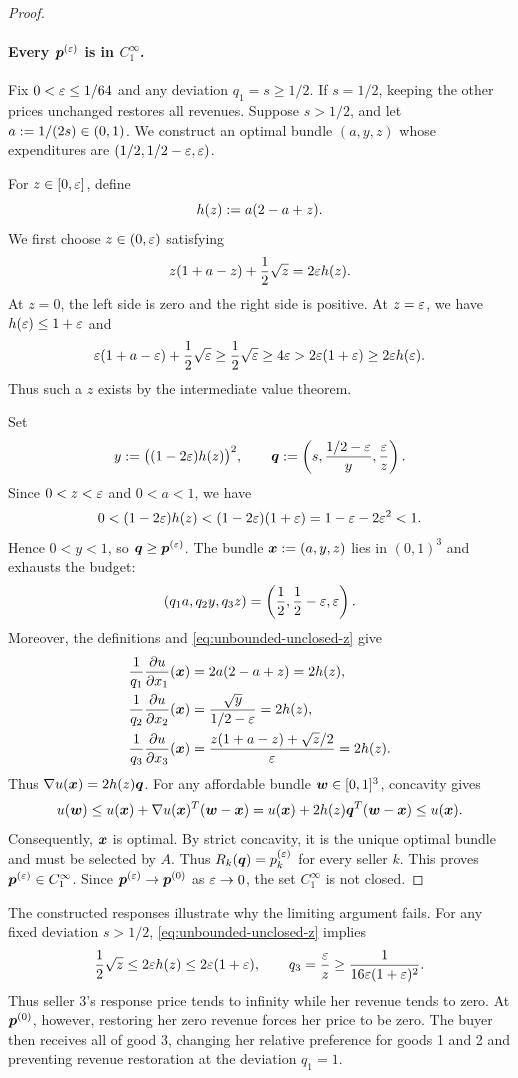 \begin{proof}
\paragraph{Every $\bm{p}^{(\varepsilon)}$ is in $C_1^\infty$.}
Fix $0 < \varepsilon \le 1/64$ and any deviation $q_1 = s \ge 1/2$.
If $s = 1/2$, keeping the other prices unchanged restores all revenues.
Suppose $s > 1/2$, and let $a := 1/(2s) \in (0, 1)$.
We construct an optimal bundle $(a, y, z)$ whose expenditures are $(1/2, 1/2 - \varepsilon, \varepsilon)$.

For $z \in [0, \varepsilon]$, define
\[ h(z) := a(2 - a + z). \]
We first choose $z \in (0, \varepsilon)$ satisfying
\begin{equation}
\label{eq:unbounded-unclosed-z}
z(1 + a - z) + \frac12\sqrt{z} = 2\varepsilon h(z).
\end{equation}
At $z = 0$, the left side is zero and the right side is positive.
At $z = \varepsilon$, we have $h(\varepsilon) \le 1 + \varepsilon$ and
\[ \varepsilon(1 + a - \varepsilon) + \frac12\sqrt{\varepsilon} \ge \frac12\sqrt{\varepsilon}
    \ge 4\varepsilon > 2\varepsilon(1 + \varepsilon) \ge 2\varepsilon h(\varepsilon). \]
Thus such a $z$ exists by the intermediate value theorem.

Set
\[ y := \bigl((1 - 2\varepsilon)h(z)\bigr)^2, \qquad
    \bm{q} := \left(s, \frac{1/2 - \varepsilon}{y}, \frac{\varepsilon}{z}\right). \]
Since $0 < z < \varepsilon$ and $0 < a < 1$, we have
\[ 0 < (1 - 2\varepsilon)h(z) < (1 - 2\varepsilon)(1 + \varepsilon) = 1 - \varepsilon - 2\varepsilon^2 < 1. \]
Hence $0 < y < 1$, so $\bm{q} \ge \bm{p}^{(\varepsilon)}$.
The bundle $\bm{x} := (a, y, z)$ lies in $(0, 1)^3$ and exhausts the budget:
\[ (q_1a, q_2y, q_3z) = \left(\frac12, \frac12 - \varepsilon, \varepsilon\right). \]
Moreover, the definitions and \cref{eq:unbounded-unclosed-z} give
\begin{align*}
\frac{1}{q_1}\frac{\partial u}{\partial x_1}(\bm{x}) &= 2a(2 - a + z) = 2h(z),
\\ \frac{1}{q_2}\frac{\partial u}{\partial x_2}(\bm{x}) &= \frac{\sqrt{y}}{1/2 - \varepsilon} = 2h(z),
\\ \frac{1}{q_3}\frac{\partial u}{\partial x_3}(\bm{x}) &= \frac{z(1 + a - z) + \sqrt{z}/2}{\varepsilon} = 2h(z).
\end{align*}
Thus $\nabla u(\bm{x}) = 2h(z)\bm{q}$.
For any affordable bundle $\bm{w} \in [0, 1]^3$, concavity gives
\[ u(\bm{w}) \le u(\bm{x}) + \nabla u(\bm{x})^T(\bm{w} - \bm{x})
    = u(\bm{x}) + 2h(z)\bm{q}^T(\bm{w} - \bm{x}) \le u(\bm{x}). \]
Consequently, $\bm{x}$ is optimal.
By strict concavity, it is the unique optimal bundle and must be selected by $A$.
Thus $R_k(\bm{q}) = p_k^{(\varepsilon)}$ for every seller $k$.
This proves $\bm{p}^{(\varepsilon)} \in C_1^\infty$.
Since $\bm{p}^{(\varepsilon)} \to \bm{p}^{(0)}$ as $\varepsilon \to 0$,
the set $C_1^\infty$ is not closed.
\end{proof}

The constructed responses illustrate why the limiting argument fails.
For any fixed deviation $s > 1/2$, \cref{eq:unbounded-unclosed-z} implies
\[ \frac12\sqrt{z} \le 2\varepsilon h(z) \le 2\varepsilon(1 + \varepsilon), \qquad
    q_3 = \frac{\varepsilon}{z} \ge \frac{1}{16\varepsilon(1 + \varepsilon)^2}. \]
Thus seller 3's response price tends to infinity while her revenue tends to zero.
At $\bm{p}^{(0)}$, however, restoring her zero revenue forces her price to be zero.
The buyer then receives all of good 3, changing her relative preference
for goods 1 and 2 and preventing revenue restoration at the deviation $q_1 = 1$.
